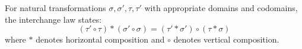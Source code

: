 For natural transformations $\sigma, \sigma', \tau, \tau'$ with appropriate domains and codomains, the interchange law states:
$$(\tau' \circ \tau) * (\sigma' \circ \sigma) = (\tau' * \sigma') \circ (\tau * \sigma)$$
where $*$ denotes horizontal composition and $\circ$ denotes vertical composition.
